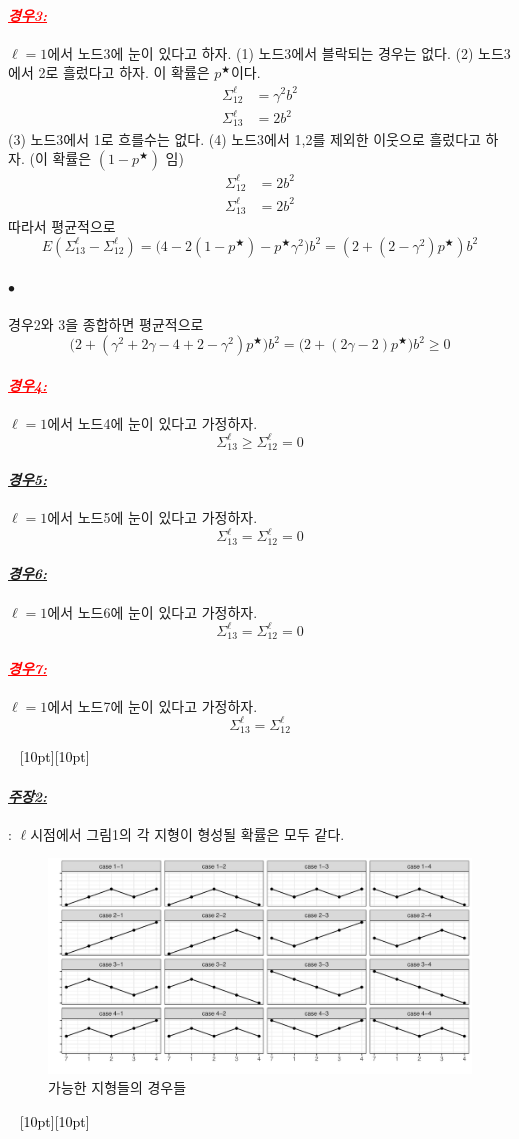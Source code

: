 \documentclass[12pt,oneside,english,a4paper]{article}
\newcommand{\dash}{\noindent \newline\textcolor{black}{\hrulefill~ \raisebox{-2.5pt}[10pt][10pt]{\leafright \decofourleft \decothreeleft  \aldineright \decotwo \floweroneleft \decoone   \floweroneright \decotwo \aldineleft\decothreeright \decofourright \leafleft} ~  \hrulefill}}
\def\ck{\paragraph{\LARGE$\bullet$}\LARGE}
\newcommand{\para}[1]{\paragraph{\LARGE\it\underline{\textbf{#1:}}}\LARGE}
\newcommand{\parared}[1]{\paragraph{\LARGE\textcolor{red}{\it\underline{\textbf{#1:}}}}\LARGE}
\begin{document}
\parared{경우3} $\ell=1$에서 노드3에 눈이 있다고 하자. (1) 노드3에서 블락되는 경우는 없다. (2) 노드3에서 2로 흘렀다고 하자. 이 확률은 $p^{\bigstar}$이다. 
\begin{align*}
\Sigma_{12}^{\ell}&=\gamma^2b^2 \\
\Sigma_{13}^{\ell}&=2b^2
\end{align*}
(3) 노드3에서 1로 흐를수는 없다. (4) 노드3에서 1,2를 제외한 이웃으로 흘렀다고 하자. (이 확률은 $(1-p^{\bigstar})$ 임)
\begin{align*}
\Sigma_{12}^{\ell}&=2b^2 \\
\Sigma_{13}^{\ell}&=2b^2
\end{align*}
따라서 평균적으로 
\[
E(\Sigma_{13}^{\ell}-\Sigma_{12}^{\ell})=\big(4-2(1-p^{\bigstar})-p^{\bigstar}\gamma^2 \big)b^2=(2+(2-\gamma^2)p^{\bigstar})b^2
\]

\ck 경우2와 3을 종합하면 평균적으로 
\[
\big(2+(\gamma^2+2\gamma-4+2-\gamma^2)p^{\bigstar}\big)b^2
=\big(2+(2\gamma-2)p^{\bigstar}\big)b^2\geq 0
\]

\parared{경우4} $\ell=1$에서 노드4에 눈이 있다고 가정하자. 
\[
\Sigma_{13}^{\ell}\geq\Sigma_{12}^{\ell}=0
\]

\para{경우5} $\ell=1$에서 노드5에 눈이 있다고 가정하자. 
\[
\Sigma_{13}^{\ell}=\Sigma_{12}^{\ell}=0
\]
\para{경우6} $\ell=1$에서 노드6에 눈이 있다고 가정하자. 
\[
\Sigma_{13}^{\ell}=\Sigma_{12}^{\ell}=0
\]

\parared{경우7} $\ell=1$에서 노드7에 눈이 있다고 가정하자. 
\[
\Sigma_{13}^{\ell}=\Sigma_{12}^{\ell}
\]

\dash

\para{주장2}: $\ell$시점에서 그림1의 각 지형이 형성될 확률은 모두 같다. 

\begin{figure}[h]
\center
\includegraphics[width=1\textwidth]{Fig1.pdf}
\caption{가능한 지형들의 경우들}
\end{figure}
\dash
\end{document}
